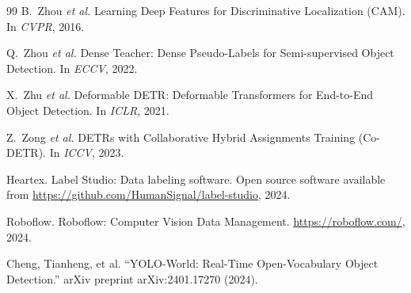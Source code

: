 \begin{thebibliography}{99}
B.~Zhou \textit{et al.}
\newblock Learning Deep Features for Discriminative Localization (CAM).
\newblock In \textit{CVPR}, 2016.

Q.~Zhou \textit{et al.}
\newblock Dense Teacher: Dense Pseudo-Labels for Semi-supervised Object Detection.
\newblock In \textit{ECCV}, 2022.

X.~Zhu \textit{et al.}
\newblock Deformable DETR: Deformable Transformers for End-to-End Object Detection.
\newblock In \textit{ICLR}, 2021.

Z.~Zong \textit{et al.}
\newblock DETRs with Collaborative Hybrid Assignments Training (Co-DETR).
\newblock In \textit{ICCV}, 2023.

Heartex.
\newblock Label Studio: Data labeling software.
\newblock Open source software available from \url{https://github.com/HumanSignal/label-studio}, 2024.

Roboflow.
\newblock Roboflow: Computer Vision Data Management.
\newblock \url{https://roboflow.com/}, 2024.

Cheng, Tianheng, et al. ``YOLO-World: Real-Time Open-Vocabulary Object Detection.'' arXiv preprint arXiv:2401.17270 (2024).

\end{thebibliography}


